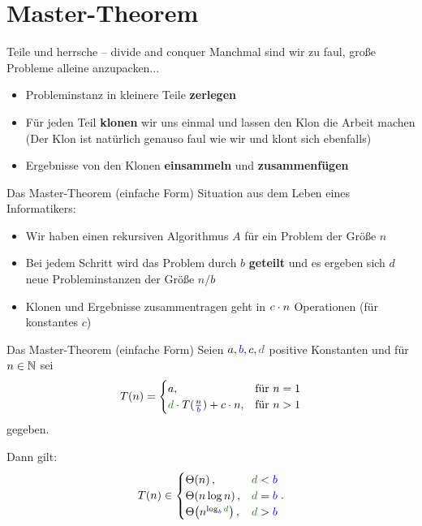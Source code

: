 \section{Master-Theorem}

\begin{frame}{Teile und herrsche -- divide and conquer}
	Manchmal sind wir zu faul, große Probleme alleine anzupacken...
	\begin{itemize}
		\item Probleminstanz in kleinere Teile \textbf{zerlegen}
		\item Für jeden Teil \textbf{klonen} wir uns einmal und lassen den Klon die Arbeit machen \\
		{\small (Der Klon ist natürlich genauso faul wie wir und klont sich ebenfalls)}
		\item Ergebnisse von den Klonen \textbf{einsammeln} und \textbf{zusammenfügen}
	\end{itemize}
\end{frame}

\begin{frame}{Das Master-Theorem (einfache Form)}
	Situation aus dem Leben eines Informatikers: 
	\begin{itemize}[<+->]
		\item Wir haben einen rekursiven Algorithmus $A$ für ein Problem der Größe $n$
		\item Bei jedem Schritt wird das Problem durch $b$ \textbf{geteilt} und es ergeben sich $d$ neue Probleminstanzen der Größe $n/b$
		\item Klonen und Ergebnisse zusammentragen geht in $c \cdot n$ Operationen (für konstantes $c$)
	\end{itemize}
\end{frame}

\begin{frame}{Das Master-Theorem (einfache Form)}  
	Seien $a, \textcolor{blue}{b}, c, \textcolor{darkgreen}{d}$ positive Konstanten und für $n \in \mathbb{N}$ sei 
	\[
	T(n) = 
	\begin{cases}
	a,  & \text{für } n = 1 \\
	\textcolor{darkgreen}{d} \cdot T\large(\frac{n}{\textcolor{blue}{b}}\large) + c\*n, & \text{für } n > 1
	\end{cases}
	\]
	gegeben. \\ \smallskip
	
	Dann gilt:
	\[
	T(n) \in 
	\begin{cases}
	\Th{n},                                                        & \textcolor{darkgreen}{d} < \textcolor{blue}{b} \\
	\Th{n \log n},                                                 & \textcolor{darkgreen}{d} = \textcolor{blue}{b} \\
	\Th{n^{\log _{\textcolor{blue}{b}} \textcolor{darkgreen}{d}}}, & \textcolor{darkgreen}{d} > \textcolor{blue}{b}
	\end{cases}.
	\]
\end{frame}

